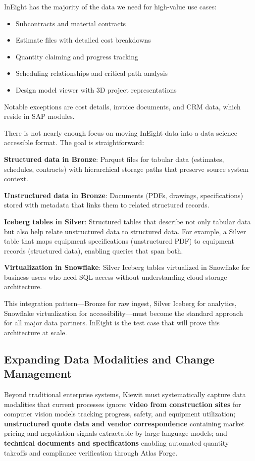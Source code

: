 \documentclass[12pt, a4paper]{article}
\begin{document}
InEight has the majority of the data we need for high-value use cases:

\begin{itemize}[leftmargin=*, nosep]
    \item Subcontracts and material contracts
    \item Estimate files with detailed cost breakdowns
    \item Quantity claiming and progress tracking
    \item Scheduling relationships and critical path analysis
    \item Design model viewer with 3D project representations
\end{itemize}

Notable exceptions are cost details, invoice documents, and CRM data, which reside in SAP modules.

There is not nearly enough focus on moving InEight data into a data science accessible format. The goal is straightforward:

\textbf{Structured data in Bronze}: Parquet files for tabular data (estimates, schedules, contracts) with hierarchical storage paths that preserve source system context.

\textbf{Unstructured data in Bronze}: Documents (PDFs, drawings, specifications) stored with metadata that links them to related structured records.

\textbf{Iceberg tables in Silver}: Structured tables that describe not only tabular data but also help relate unstructured data to structured data. For example, a Silver table that maps equipment specifications (unstructured PDF) to equipment records (structured data), enabling queries that span both.

\textbf{Virtualization in Snowflake}: Silver Iceberg tables virtualized in Snowflake for business users who need SQL access without understanding cloud storage architecture.

This integration pattern—Bronze for raw ingest, Silver Iceberg for analytics, Snowflake virtualization for accessibility—must become the standard approach for all major data partners. InEight is the test case that will prove this architecture at scale.

\subsection{Expanding Data Modalities and Change Management}

Beyond traditional enterprise systems, Kiewit must systematically capture data modalities that current processes ignore: \textbf{video from construction sites} for computer vision models tracking progress, safety, and equipment utilization; \textbf{unstructured quote data and vendor correspondence} containing market pricing and negotiation signals extractable by large language models; and \textbf{technical documents and specifications} enabling automated quantity takeoffs and compliance verification through Atlas Forge.
\end{document}
